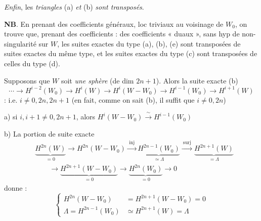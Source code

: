 \documentclass[11pt,a4paper]{article}
\begin{document}
\emph{Enfin}, les \emph{triangles} (a) \emph{et} (b) \emph{sont transposés}.

\textbf{NB}. En prenant des coefficients généraux, loc
triviaux au voisinage de \struck{\ill{}} $W_0$, on trouve que, prenant des
coefficients \ill{} : des coefficients « duaux »,  sans
hyp de  non-singularité sur $W$, les suites
exactes du type (a), (b), (e) sont transposées de suites exactes du même type,
et les suites exactes du type (c) sont transposées de celles du type (d).


Supposons que $W$ soit \emph{une sphère} (de dim $2n+1$). Alors
la suite exacte   (b)
\[
  \cdots \longrightarrow H^{i-2}(W_0) \longrightarrow H^{i}(W) \longrightarrow
  H^{i}(W - W_0) \longrightarrow H^{i-1}(W_0) \longrightarrow H^{i+1}(W)
\]
 : i.e. $i \neq 0, 2n, 2n+1$ (en fait, comme on sait
(b), il suffit que $i \neq 0, 2n$)

a) si $i, i+1 \neq 0, 2n+1$, alors $H^{i}(W - W_0) \xrightarrow{\ \sim\ } H^{i-1}(W_0)$




b) La portion de suite exacte
\[
  \begin{aligned}
  &\underbrace{H^{2n}(W)}_{=0} \to H^{2n}(W - W_0) \xrightarrow{\ \mathrm{inj}\ }
  \underbrace{H^{2n-1}(W_0)}_{\simeq \Lambda} \xrightarrow{\ \mathrm{surj}\ }
  \underbrace{H^{2n+1}(W)}_{=\Lambda} \\
  &\qquad \to \underbrace{H^{2n+1}(W - W_0)}_{=0}
  \to \underbrace{H^{2n}(W_0)}_{=0} \to 0
  \end{aligned}
\]
donne :
\[
  \left\{\begin{aligned}
    H^{2n}(W - W_0) &= H^{2n+1}(W - W_0) = 0 \\
    \Lambda = H^{2n-1}(W_0) &\simeq H^{2n+1}(W) = \Lambda
  \end{aligned}\right.
\]
\end{document}
